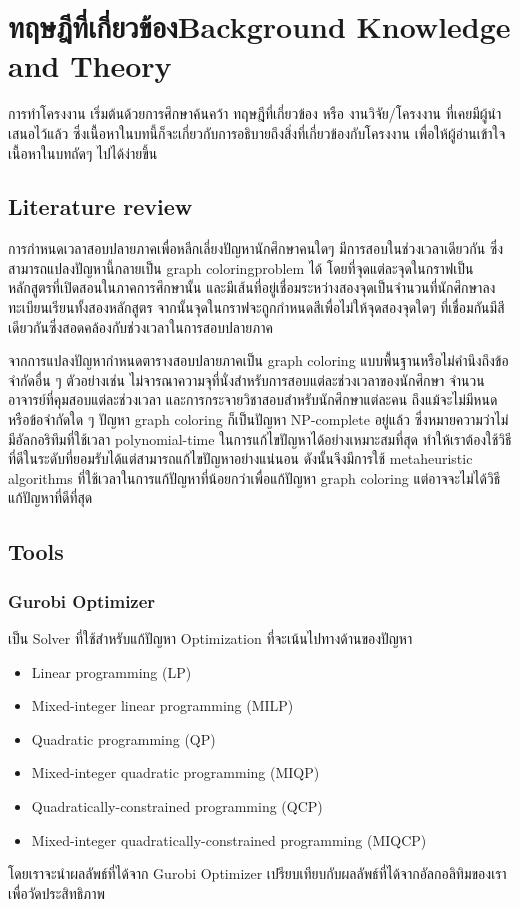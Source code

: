 \chapter{\ifcpe ทฤษฎีที่เกี่ยวข้อง\else Background Knowledge and Theory\fi}
การทำโครงงาน เริ่มต้นด้วยการศึกษาค้นคว้า ทฤษฎีที่เกี่ยวข้อง หรือ งานวิจัย/โครงงาน ที่เคยมีผู้นำเสนอไว้แล้ว ซึ่งเนื้อหาในบทนี้ก็จะเกี่ยวกับการอธิบายถึงสิ่งที่เกี่ยวข้องกับโครงงาน เพื่อให้ผู้อ่านเข้าใจเนื้อหาในบทถัดๆ ไปได้ง่ายขึ้น
\section{Literature review}
การกำหนดเวลาสอบปลายภาคเพื่อหลีกเลี่ยงปัญหานักศึกษาคนใดๆ มีการสอบในช่วงเวลาเดียวกัน ซึ่งสามารถแปลงปัญหานี้กลายเป็น graph coloringproblem ได้ 
โดยที่จุดแต่ละจุดในกราฟเป็นหลักสูตรที่เปิดสอนในภาคการศึกษานั้น 
และมีเส้นที่อยู่เชื่อมระหว่างสองจุดเป็นจำนวนที่นักศึกษาลงทะเบียนเรียนทั้งสองหลักสูตร จากนั้นจุดในกราฟจะถูกกำหนดสีเพื่อไม่ให้จุดสองจุดใดๆ 
ที่เชื่อมกันมีสีเดียวกันซึ่งสอดคล้องกับช่วงเวลาในการสอบปลายภาค

จากการแปลงปัญหากำหนดตารางสอบปลายภาคเป็น graph coloring แบบพื้นฐานหรือไม่คำนึงถึงข้อจำกัดอื่น ๆ 
ตัวอย่างเช่น ไม่จารณาความจุที่นั่งสำหรับการสอบแต่ละช่วงเวลาของนักศึกษา จำนวนอาจารย์ที่คุมสอบแต่ละช่วงเวลา และการกระจายวิชาสอบสำหรับนักศึกษาแต่ละคน 
ถึงแม้จะไม่มีหนดหรือข้อจำกัดใด ๆ ปัญหา graph coloring ก็เป็นปัญหา NP-complete อยู่แล้ว 
ซึ่งหมายความว่าไม่มีอัลกอริทึมที่ใช้เวลา polynomial-time ในการแก้ไขปัญหาได้อย่างเหมาะสมที่สุด 
ทำให้เราต้องใช้วิธีที่ดีในระดับที่ยอมรับได้แต่สามารถแก้ไขปัญหาอย่างแน่นอน ดังนั้นจึงมีการใช้ metaheuristic algorithms ที่ใช้เวลาในการแก้ปัญหาที่น้อยกว่าเพื่อแก้ปัญหา graph coloring แต่อาจจะไม่ได้วิธีแก้ปัญหาที่ดีที่สุด
\section{Tools}
\subsection{Gurobi Optimizer}
  เป็น Solver ที่ใช้สำหรับแก้ปัญหา Optimization ที่จะเน้นไปทางด้านของปัญหา 
\begin{itemize}
  \item Linear programming (LP)
  \item Mixed-integer linear programming (MILP)
  \item Quadratic programming (QP)
  \item Mixed-integer quadratic programming (MIQP)
  \item Quadratically-constrained programming (QCP)
  \item Mixed-integer quadratically-constrained programming (MIQCP)
\end{itemize}
โดยเราจะนำผลลัพธ์ที่ได้จาก Gurobi Optimizer เปรียบเทียบกับผลลัพธ์ที่ได้จากอัลกอลิทิมของเราเพื่อวัดประสิทธิภาพ


